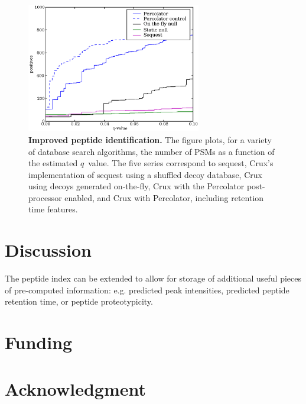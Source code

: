 \documentclass{bioinfo}
\begin{document}
\begin{figure}
\centering
\includegraphics[width=3in]{./Images/q-value.eps}
\caption{{\bf Improved peptide identification.}  The figure plots, for
  a variety of database search algorithms, the number of PSMs as a
  function of the estimated $q$~value.  The five series correspond to
  {\sc sequest}, Crux's implementation of {\sc sequest} using a shuffled decoy
  database, Crux using decoys generated on-the-fly, Crux with the
  Percolator post-processor enabled, and Crux with Percolator,
  including retention time features.
  \label{figure:pq-plot}}
\end{figure}

\section{Discussion}

The peptide index can be extended to allow for
storage of additional useful pieces of pre-computed information: 
e.g.  predicted peak intensities, predicted peptide retention time,
or peptide proteotypicity.  %


\section*{Funding}

\section*{Acknowledgment}







 
\end{document}
